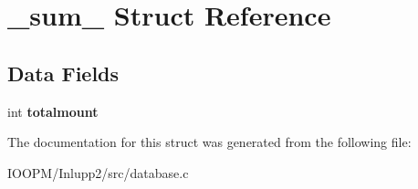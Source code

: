 \hypertarget{struct__sum__}{}\section{\+\_\+sum\+\_\+ Struct Reference}
\label{struct__sum__}
\subsection*{Data Fields}
\begin{DoxyCompactItemize}
\item 
\hypertarget{struct__sum___ae628245a3b1704096bb2100396bdc582}{}int {\bfseries totalmount}\label{struct__sum___ae628245a3b1704096bb2100396bdc582}

\end{DoxyCompactItemize}


The documentation for this struct was generated from the following file\+:\begin{DoxyCompactItemize}
\item 
I\+O\+O\+P\+M/\+Inlupp2/src/database.\+c\end{DoxyCompactItemize}
